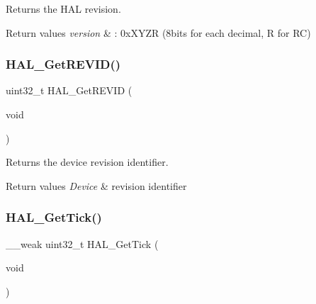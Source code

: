 Returns the H\+AL revision. 


\begin{DoxyRetVals}{Return values}
{\em version} & \+: 0x\+X\+Y\+ZR (8bits for each decimal, R for RC) \\
\hline
\end{DoxyRetVals}
\mbox{\label{group___h_a_l___exported___functions___group2_gae051ef9e932404b21f5877c7186406b8}} 
\subsubsection{\texorpdfstring{H\+A\+L\+\_\+\+Get\+R\+E\+V\+I\+D()}{HAL\_GetREVID()}}
{\footnotesize\ttfamily uint32\+\_\+t H\+A\+L\+\_\+\+Get\+R\+E\+V\+ID (\begin{DoxyParamCaption}\item[{void}]{ }\end{DoxyParamCaption})}



Returns the device revision identifier. 


\begin{DoxyRetVals}{Return values}
{\em Device} & revision identifier \\
\hline
\end{DoxyRetVals}
\mbox{\label{group___h_a_l___exported___functions___group2_gac9b3a85a73735ac840d0dcb59bc0fdd6}} 
\subsubsection{\texorpdfstring{H\+A\+L\+\_\+\+Get\+Tick()}{HAL\_GetTick()}}
{\footnotesize\ttfamily \+\_\+\+\_\+weak uint32\+\_\+t H\+A\+L\+\_\+\+Get\+Tick (\begin{DoxyParamCaption}\item[{void}]{ }\end{DoxyParamCaption})}



